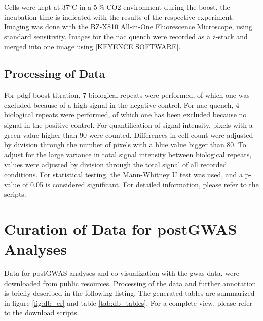     Cells were kept at 37°C in a 5\,\% CO2 environment during the boost, the incubation time is indicated with the results of the respective experiment. Imaging was done with the BZ-X810 All-in-One Fluorescence Microscope, using standard sensitivity. Images for the \ac{nac} quench were recorded as a z-stack and merged into one image using [KEYENCE SOFTWARE].

    \subsection{Processing of Data}
    \label{subsec:cellrox_data_processing}
    For \ac{pdgf}-boost titration, 7 biological repeats were performed, of which one was excluded because of a high signal in the negative control. For \ac{nac} quench, 4 biological repeats were performed, of which one has been excluded because no signal in the positive control.
    For quantification of signal intensity, pixels with a green value higher than 90 were counted. Differences in cell count were adjusted by division through the number of pixels with a blue value bigger than 80. To adjust for the large variance in total signal intensity between biological repeats, values were adjusted by division through the total signal of all recorded conditions.
    For statistical testing, the Mann-Whitney U test was used, and a p-value of 0.05 is considered significant. For detailed information, please refer to the scripts.


\section{Curation of Data for postGWAS Analyses}
\label{sec:database}
Data for postGWAS analyses and co-visualization with the \ac{gwas} data, were downloaded from public resources. Processing of the data and further annotation is briefly described in the following listing. The generated tables are summarized in figure \ref{fig:db_er} and table \ref{tab:db_tables}. For a complete view, please refer to the download scripts.

